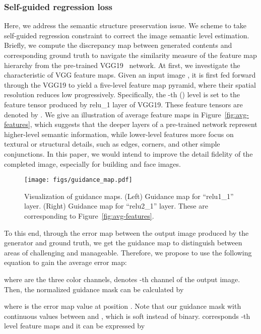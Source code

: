 \documentclass[journal]{IEEEtran}
\begin{document}
\subsubsection{Self-guided regression loss}
Here, we address the semantic structure preservation issue. We scheme to take self-guided regression constraint to correct the image semantic level estimation. Briefly, we compute the discrepancy map between generated contents and corresponding ground truth to navigate the similarity measure of the feature map hierarchy from the pre-trained VGG19~\cite{VGG19} network. At first, we investigate the characteristic of VGG feature maps. Given an input image , it is first fed forward through the VGG19 to yield a five-level feature map pyramid, where their spatial resolution reduces low progressively. Specifically, the -th () level is set to the feature tensor produced by relu\_1 layer of VGG19. These feature tensors are denoted by . We give an illustration of average feature maps  in Figure~\ref{fig:avg-features}, which suggests that the deeper layers of a pre-trained network represent higher-level semantic information, while lower-level features more focus on textural or structural details, such as edges, corners, and other simple conjunctions. In this paper, we would intend to improve the detail fidelity of the completed image, especially for building and face images.

\begin{figure}[htpb]
	\centering
	\texttt{[image: figs/guidance\_map.pdf]}
	\caption{Visualization of guidance maps. (Left) Guidance map  for ``relu1\_1'' layer. (Right) Guidance map  for ``relu2\_1'' layer. These are corresponding to Figure~\ref{fig:avg-features}.}
	\label{fig:guidance-map}
\end{figure}

To this end, through the error map between the output image produced by the generator and ground truth, we get the guidance map to distinguish between areas of challenging and manageable. Therefore, we propose to use the following equation to gain the average error map:


where  are the three color channels,  denotes -th channel of the output image. Then, the normalized guidance mask can be calculated by

where  is the error map value at position . Note that our guidance mask with continuous values between  and , which is soft instead of binary.  corresponds -th level feature maps and it can be expressed by
\end{document}
